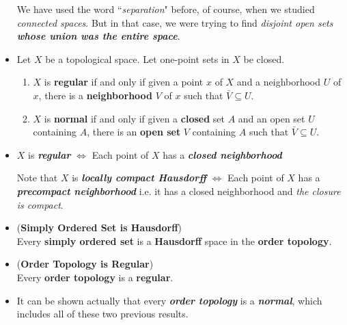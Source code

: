 \documentclass[11pt]{article}
\begin{document}
\begin{itemize}
\begin{remark}
We have used the word ``\emph{separation}" before, of course, when we studied \emph{connected spaces}. But in that case, we were trying to find \emph{disjoint open sets} \emph{\textbf{whose union was the entire space}}.
\end{remark}

\item \begin{lemma}
Let $X$ be a topological space. Let one-point sets in $X$ be closed.
\begin{enumerate}
\item $X$ is \textbf{regular} if and only if given a point $x$ of $X$ and a neighborhood $U$ of $x$,
there is a \textbf{neighborhood} $V$ of $x$ such that $\bar{V} \subseteq U$.
\item $X$ is \textbf{normal} if and only if given a \textbf{closed} set $A$ and an open set $U$ containing $A$,
there is an \textbf{open set} $V$ containing $A$ such that $\bar{V}\subseteq U$.
\end{enumerate}
\end{lemma}

\item \begin{remark}
$X$ is \emph{\textbf{regular}} $\Leftrightarrow$  Each point of $X$ has a \textbf{\emph{closed neighborhood}}

Note that $X$  is \emph{\textbf{locally compact Hausdorff}} $\Leftrightarrow$ Each point of $X$ has a \textbf{\emph{precompact neighborhood}} i.e. it has a closed neighborhood and \emph{the closure is compact}.
\end{remark}

\item \begin{proposition} (\textbf{Simply Ordered Set is Hausdorff}) \citep{munkres2000topology} \\
Every \textbf{simply ordered set} is a \textbf{Hausdorff} space in the \textbf{order topology}. 
\end{proposition}

\item \begin{proposition} (\textbf{Order Topology is Regular}) \citep{munkres2000topology} \\
Every \textbf{order topology} is a \textbf{regular}. 
\end{proposition}

\item \begin{remark}
It can be shown actually that every \textbf{\emph{order topology}} is a \textbf{\emph{normal}}, which includes all of these two previous results.
\end{remark}


\end{itemize}
\end{document}
